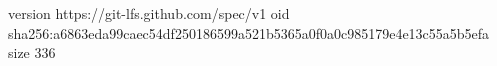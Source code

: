 version https://git-lfs.github.com/spec/v1
oid sha256:a6863eda99caec54df250186599a521b5365a0f0a0c985179e4e13c55a5b5efa
size 336
